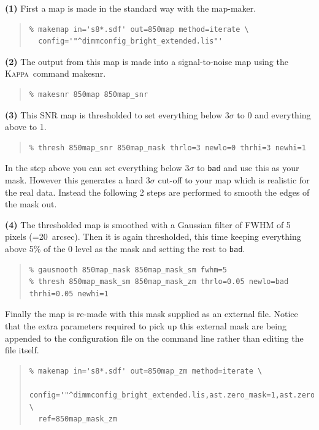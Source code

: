 \documentclass[twoside,11pt]{article}
\newcommand{\xref}[3]{#1}
\renewcommand{\_}{\texttt{\symbol{95}}}
\newenvironment{myquote}{\begin{quote}\begin{small}}{\end{small}\end{quote}}
\newcommand{\Kappa}{\xref{\textsc{Kappa}}{sun95}{}}
\newcommand{\task}[1]{\textsf{#1}}
\newcommand{\makesnr}{\xref{\task{makesnr}}{sun95}{MAKESNR}}
\begin{document}
\textbf{(1)} First a map is made in the standard way with the map-maker.
\begin{myquote}
\begin{verbatim}
% makemap in='s8*.sdf' out=850map method=iterate \
  config='"^dimmconfig_bright_extended.lis"'
\end{verbatim}
\end{myquote}
\textbf{(2)} The output from this map is made into a signal-to-noise map using the
\Kappa\ command \makesnr.
\begin{myquote}
\begin{verbatim}
% makesnr 850map 850map_snr
\end{verbatim}
\end{myquote}
\textbf{(3)} This SNR map is thresholded to set everything below 3$\sigma$ to 0 and
everything above to 1.
\begin{myquote}
\begin{verbatim}
% thresh 850map_snr 850map_mask thrlo=3 newlo=0 thrhi=3 newhi=1
\end{verbatim}
\end{myquote}
In the step above you can set everything below 3$\sigma$ to
\texttt{bad} and use this as your mask. However this generates a hard
3$\sigma$ cut-off to your map which is realistic for the real data.
Instead the following 2 steps are performed to smooth the edges of the
mask out.

\textbf{(4)} The thresholded map is smoothed with a Gaussian filter
of FWHM of 5 pixels (=20~arcsec). Then it is again thresholded, this time
keeping everything above 5\% of the 0 level as the mask and setting
the rest to \texttt{bad}.
\begin{myquote}
\begin{verbatim}
% gausmooth 850map_mask 850map_mask_sm fwhm=5
% thresh 850map_mask_sm 850map_mask_zm thrlo=0.05 newlo=bad thrhi=0.05 newhi=1
\end{verbatim}
\end{myquote}
Finally the map is re-made with this mask supplied as an external
file. Notice that the extra parameters required to pick up this external
mask are being appended to the configuration file on the command line
rather than editing the file itself.
\begin{myquote}
\begin{verbatim}
% makemap in='s8*.sdf' out=850map_zm method=iterate \
  config='"^dimmconfig_bright_extended.lis,ast.zero_mask=1,ast.zero_snr=0"' \
  ref=850map_mask_zm
\end{verbatim}
\end{myquote}
\end{document}
